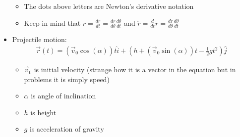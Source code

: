 \documentclass{article}
\begin{document}
\begin{itemize}
\begin{itemize}
    \item The dots above letters are Newton's derivative notation
    \item Keep in mind that $\dot{r} = \frac{dr}{dt} = \frac{dr}{d\theta}\frac{d\theta}{dt}$ and $\ddot{r} = \frac{d}{dt}\dot{r} = \frac{d\dot{r}}{d\theta}\frac{d\theta}{dt}$
  \end{itemize}
  \item Projectile motion:
  \begin{align}
    \vec{r}(t) = (\vec{v}_0\cos(\alpha))t\hat{i} + \left( h + (\vec{v}_0\sin(\alpha))t - \frac{1}{2}gt^2 \right) \hat{j}
  \end{align}
  \begin{itemize}
    \item $\vec{v}_0$ is initial velocity (strange how it is a vector in the equation but in problems it is simply speed)
    \item $\alpha$ is angle of inclination
    \item $h$ is height
    \item $g$ is acceleration of gravity
  \end{itemize}
\end{itemize}
\end{document}
